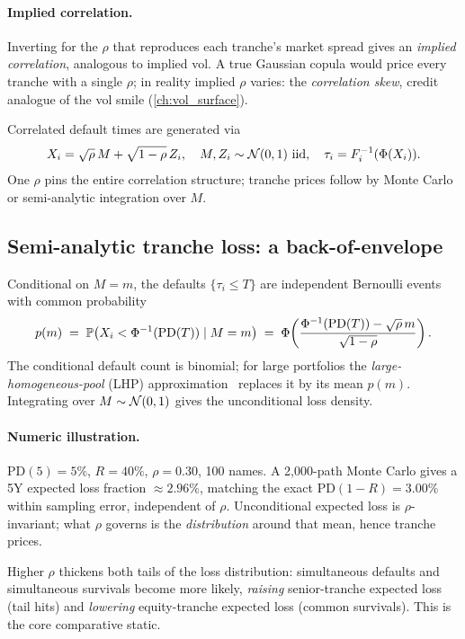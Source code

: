 \paragraph{Implied correlation.}  Inverting for the $\rho$ that
reproduces each tranche's market spread gives an \emph{implied
correlation}, analogous to implied vol.  A true Gaussian copula
would price every tranche with a single $\rho$; in reality implied
$\rho$ varies: the \emph{correlation skew}, credit analogue of
the vol smile (\cref{ch:vol_surface}).

\begin{keyfactbox}
Correlated default times are generated via
\[
  X_i = \sqrt{\rho}\, M + \sqrt{1 - \rho}\, Z_i, \quad
  M, Z_i \sim \mathcal{N}(0,1) \text{ iid}, \quad
  \tau_i = F_i^{-1}(\Phi(X_i)).
\]
One $\rho$ pins the entire correlation structure; tranche prices
follow by Monte Carlo or semi-analytic integration over $M$.
\end{keyfactbox}

\subsection{Semi-analytic tranche loss: a back-of-envelope}
\label{sec:tranche_semianalytic}

Conditional on $M = m$, the defaults $\{\tau_i \le T\}$ are
independent Bernoulli events with common probability
\[
  p(m)
  \;=\; \mathbb{P}\!\left(X_i < \Phi^{-1}(\mathrm{PD}(T)) \mid M = m\right)
  \;=\; \Phi\!\left(\frac{\Phi^{-1}(\mathrm{PD}(T)) - \sqrt{\rho}\,m}{\sqrt{1 - \rho}}\right).
\]
The conditional default count is binomial; for large portfolios
the \emph{large-homogeneous-pool} (LHP) approximation \citeHull\
replaces it by its mean $p(m)$.  Integrating over $M \sim
\mathcal{N}(0,1)$ gives the unconditional loss density.

\paragraph{Numeric illustration.}  $\mathrm{PD}(5) = 5\%$, $R =
40\%$, $\rho = 0.30$, 100 names.  A 2{,}000-path Monte Carlo gives
a 5Y expected loss fraction $\approx 2.96\%$, matching the exact
$\mathrm{PD}(1-R) = 3.00\%$ within sampling error, independent of
$\rho$.  Unconditional expected loss is $\rho$-invariant; what
$\rho$ governs is the \emph{distribution} around that mean, hence
tranche prices.

Higher $\rho$ thickens both tails of the loss distribution:
simultaneous defaults and simultaneous survivals become more likely,
\emph{raising} senior-tranche expected loss (tail hits) and
\emph{lowering} equity-tranche expected loss (common survivals).
This is the core comparative static.

